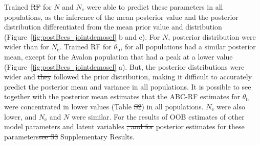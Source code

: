 \documentclass[a4paper, 12pt]{article}
\providecommand{\DIFaddtex}[1]{{\protect\color{blue}\uwave{#1}}} %
\providecommand{\DIFdeltex}[1]{{\protect\color{red}\sout{#1}}}                      %
\providecommand{\DIFaddbegin}{} %
\providecommand{\DIFaddend}{} %
\providecommand{\DIFdelbegin}{} %
\providecommand{\DIFdelend}{} %
\providecommand{\DIFadd}[1]{\texorpdfstring{\DIFaddtex{#1}}{#1}} %
\providecommand{\DIFdel}[1]{\texorpdfstring{\DIFdeltex{#1}}{}} %
\newcommand{\DIFscaledelfig}{0.5}
\newlength{\DIFdelgraphicswidth} %
\newlength{\DIFdelgraphicsheight} %
\newcommand{\DIFaddincludegraphics}[2][]{{\color{blue}\fbox{\DIFOincludegraphics[#1]{#2}}}} %
\newcommand{\DIFdelincludegraphics}[2][]{%
\sbox{\DIFdelgraphicsbox}{\DIFOincludegraphics[#1]{#2}}%
\settoboxwidth{\DIFdelgraphicswidth}{\DIFdelgraphicsbox} %
\settoboxtotalheight{\DIFdelgraphicsheight}{\DIFdelgraphicsbox} %
\scalebox{\DIFscaledelfig}{%
\parbox[b]{\DIFdelgraphicswidth}{\usebox{\DIFdelgraphicsbox}\\[-\baselineskip] \rule{\DIFdelgraphicswidth}{0em}}\llap{\resizebox{\DIFdelgraphicswidth}{\DIFdelgraphicsheight}{%
\setlength{\unitlength}{\DIFdelgraphicswidth}%
\begin{picture}(1,1)%
\thicklines\linethickness{2pt} %
{\color[rgb]{1,0,0}\put(0,0){\framebox(1,1){}}}%
{\color[rgb]{1,0,0}\put(0,0){\line( 1,1){1}}}%
{\color[rgb]{1,0,0}\put(0,1){\line(1,-1){1}}}%
\end{picture}%
}\hspace*{3pt}}} %
} %
\DeclareRobustCommand{\DIFaddbegin}{\DIFOaddbegin \let\includegraphics\DIFaddincludegraphics} %
\DeclareRobustCommand{\DIFaddend}{\DIFOaddend \let\includegraphics\DIFOincludegraphics} %
\DeclareRobustCommand{\DIFdelbegin}{\DIFOdelbegin \let\includegraphics\DIFdelincludegraphics} %
\DeclareRobustCommand{\DIFdelend}{\DIFOaddend \let\includegraphics\DIFOincludegraphics} %
\begin{document}
Trained \DIFdelbegin \DIFdel{RF }\DIFdelend \DIFaddbegin \DIFadd{RFs }\DIFaddend for $N$ and $N_{\mathrm{e}}$ were able to predict these parameters in all populations, as the inference of the mean posterior value and the posterior distribution differentiated from the mean prior value and distribution (Figure~\ref{fig:postBees_jointdemosel} b and c). For $N$, posterior distribution were wider  than for $N_{\mathrm{e}}$. Trained RF for $\theta_{\mathrm{b}}$, for all populations had a similar posterior mean, except for the Avalon population that had a peak at a lower value (Figure~\ref{fig:postBees_jointdemosel} a). But, the posterior distributions were wider and \DIFdelbegin \DIFdel{they }\DIFdelend followed the prior distribution, making it difficult to accurately predict the posterior mean and variance in all populations. It is possible to see together with the posterior mean estimates that the ABC-RF estimates for $\theta_{\mathrm{b}}$ were concentrated in lower values (Table \DIFdelbegin \DIFdel{S2}\DIFdelend \DIFaddbegin \DIFadd{S3}\DIFaddend ) in all populations. $N_{\mathrm{e}}$ were also lower, and $N_{\mathrm{e}}$ and $N$ were similar. For the results of OOB estimates of other model parameters and latent variables \DIFdelbegin \DIFdel{, and for }\DIFdelend \DIFaddbegin \DIFadd{and }\DIFaddend posterior estimates for these parameters\DIFdelbegin \DIFdel{see S3 }\DIFdelend \DIFaddbegin \DIFadd{, see section S2 }\DIFaddend Supplementary Results.
\end{document}
